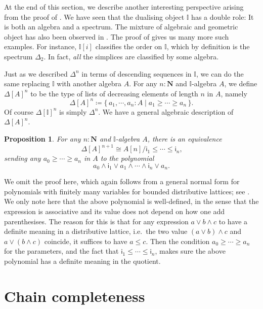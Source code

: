\documentclass[a4paper,12pt]{amsart}
\newtheorem{proposition}[theorem]{Proposition}
\theoremstyle{definition}
\newcommand{\mb}[1]{\mathbf{#1}}
\newcommand{\mbb}[1]{\mathbb{#1}}
\newcommand{\I}{\mbb I}
\newcommand{\ms}[1]{\mathsf{#1}}
\newcommand{\scomp}[2]{\{\,#1\mid#2\,\}}
\newcommand{\N}{\mb N}
\begin{document}
At the end of this section, we describe another interesting perspective arising from the proof of . We have seen that the dualising object $\I$ has a double role: It is both an algebra and a spectrum. The mixture of algebraic and geometric object has also been observed in . The proof of  gives us many more such examples. For instance, $\I[i]$ classifies the order on $\I$, which by definition is the spectrum $\Delta_2$. In fact, \emph{all} the simplices are classified by some algebra.

Just as we described $\Delta^n$ in terms of descending sequences in $\I$, we can do the same replacing $\I$ with another algebra $A$.
For any $n : \N$ and $\I$-algebra $A$, we define $\Delta[A]^{n}$ to be the type of lists of decreasing elements of length $n$ in $A$, namely
\[ \Delta[A]^{n} \coloneq \scomp{a_1,\cdots,a_n : A}{a_1 \ge \cdots \ge a_n}\text{.} \]
Of course $\Delta[\I]^n$ is simply $\Delta^n$. We have a general algebraic description of $\Delta[A]^n$.

\begin{proposition}\label{prop:simplicesasalgebra}
  For any $n : \N$ and $\I$-algebra $A$, there is an equivalence 
  \[ \Delta[A]^{n+1} \cong A[n]/\ms{i}_1 \le \cdots \le \ms{i}_n\text{,} \]
  sending any $a_0 \ge \cdots \ge a_n$ in $A$ to the polynomial 
  \[ a_0 \wedge \ms{i}_1 \vee a_1 \wedge \cdots \wedge \ms{i}_n \vee a_n\text{.} \]
\end{proposition}

We omit the proof here, which again follows from a general normal form for polynomials with finitely many variables for bounded distributive lattices; see \citet[Ch.\ 1, Thm.\ 10.21]{lausch2000algebra}. We only note here that the above polynomial is well-defined, in the sense that the expression is associative and its value does not depend on how one add parenthesises. The reason for this is that for any expression $a \vee b \wedge c$ to have a definite meaning in a distributive lattice, i.e.\ the two value $(a \vee b) \wedge c$ and $a \vee (b \wedge c)$ coincide, it suffices to have $a \le c$. Then the condition $a_0 \ge \cdots \ge a_n$ for the parameters, and the fact that $\ms{i}_1 \le \cdots \le \ms{i}_n$, makes sure the above polynomial has a definite meaning in the quotient.


\section{Chain completeness}\label{sec:infdomain}
\end{document}
